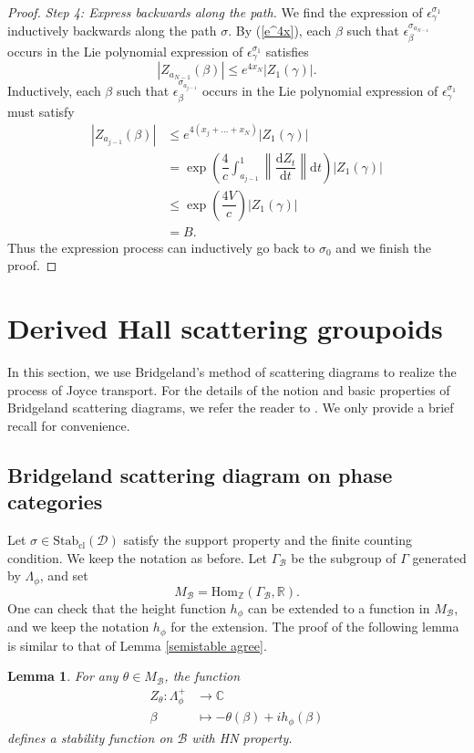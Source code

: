 \documentclass[a4paper,12pt]{amsart}
\numberwithin{equation}{section}
\newtheorem{lemma}[theorem]{Lemma}
\newcommand{\Hom}{\mathrm{Hom}}
\newcommand{\diff}{\mathrm{d}}
\newcommand{\Stab}{\mathrm{Stab}}
\newcommand{\cl}{\mathrm{cl}}
\newcommand{\1}{\mathbf{1}}
\begin{document}
\begin{proof}
    \emph{Step 4: Express backwards along the path.} We find the expression of $\epsilon^{\sigma_1}_\gamma$ inductively backwards along the path $\sigma$. By (\ref{e^4x}), each $\beta$ such that $\epsilon^{\sigma_{a_{N-1}}}_\beta$ occurs in the Lie polynomial expression of $\epsilon^{\sigma_1}_\gamma$ satisfies
    \[|Z_{a_{N-1}}(\beta)|\leqslant e^{4x_N}|Z_1(\gamma)|.\]
    Inductively, each $\beta$ such that $\epsilon^{\sigma_{a_{j-1}}}_\beta$ occurs in the Lie polynomial expression of $\epsilon^{\sigma_1}_\gamma$ must satisfy
    \begin{align*}
        |Z_{a_{j-1}}(\beta)|&\leqslant e^{4(x_j+\dots+x_N)}|Z_1(\gamma)|\\
        &=\exp\left(\dfrac{4}{c}\int_{a_{j-1}}^1\left\|\dfrac{\diff Z_t}{\diff t}\right\|\diff t\right)|Z_1(\gamma)|\\
        &\leqslant\exp\left(\dfrac{4V}{c}\right)|Z_1(\gamma)|\\
        &=B.
    \end{align*}
    Thus the expression process can inductively go back to $\sigma_0$ and we finish the proof.
\end{proof}
\section{Derived Hall scattering groupoids}
In this section, we use Bridgeland's method of scattering diagrams to realize the process of Joyce transport. For the details of the notion and basic properties of Bridgeland scattering diagrams, we refer the reader to \cite{Bri2017}. We only provide a brief recall for convenience.
\subsection{Bridgeland scattering diagram on phase categories}
Let $\sigma\in\Stab_\cl(\mathcal{D})$ satisfy the support property and the finite counting condition. We keep the notation as before. Let $\Gamma_{\mathcal{B}}$ be the subgroup of $\Gamma$ generated by $\Lambda_\phi$, and set
\[M_\mathcal{B}=\Hom_{\mathbb{Z}}(\Gamma_\mathcal{B},\mathbb{R}).\]
One can check that the height function $h_\phi$ can be extended to a function in $M_\mathcal{B}$, and we keep the notation $h_\phi$ for the extension. The proof of the following lemma is similar to that of Lemma \ref{semistable agree}.
\begin{lemma}
    For any $\theta\in M_\mathcal{B}$, the function
    \begin{align*}
        Z_\theta:\Lambda_\phi^+&\rightarrow\mathbb{C}\\
        \beta&\mapsto-\theta(\beta)+ih_\phi(\beta)
    \end{align*}
    defines a stability function on $\mathcal{B}$ with HN property.
\end{lemma}
\end{document}
